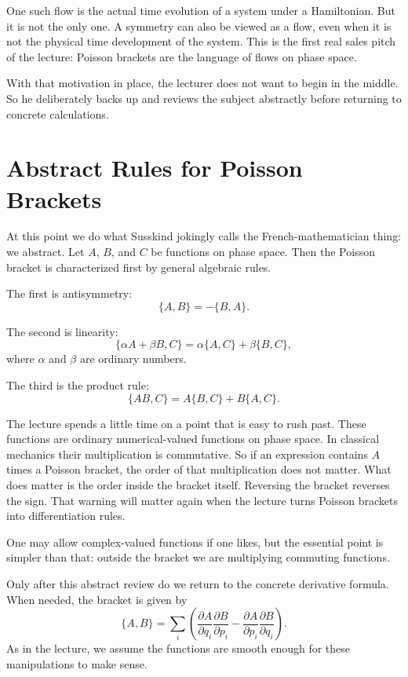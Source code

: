 One such flow is the actual time evolution of a system under a Hamiltonian. But it is not the only one. A symmetry can also be viewed as a flow, even when it is not the physical time development of the system. This is the first real sales pitch of the lecture: Poisson brackets are the language of flows on phase space.

With that motivation in place, the lecturer does not want to begin in the middle. So he deliberately backs up and reviews the subject abstractly before returning to concrete calculations.

\section{Abstract Rules for Poisson Brackets}

At this point we do what Susskind jokingly calls the French-mathematician thing: we abstract. Let \(A\), \(B\), and \(C\) be functions on phase space. Then the Poisson bracket is characterized first by general algebraic rules.

The first is antisymmetry:
\begin{equation}
\{A,B\}=-\{B,A\}.
\end{equation}

The second is linearity:
\begin{equation}
\{\alpha A+\beta B,C\}=\alpha\{A,C\}+\beta\{B,C\},
\end{equation}
where \(\alpha\) and \(\beta\) are ordinary numbers.

The third is the product rule:
\begin{equation}
\{AB,C\}=A\{B,C\}+B\{A,C\}.
\end{equation}

The lecture spends a little time on a point that is easy to rush past. These functions are ordinary numerical-valued functions on phase space. In classical mechanics their multiplication is commutative. So if an expression contains \(A\) times a Poisson bracket, the order of that multiplication does not matter. What does matter is the order inside the bracket itself. Reversing the bracket reverses the sign. That warning will matter again when the lecture turns Poisson brackets into differentiation rules.

One may allow complex-valued functions if one likes, but the essential point is simpler than that: outside the bracket we are multiplying commuting functions.

Only after this abstract review do we return to the concrete derivative formula. When needed, the bracket is given by
\begin{equation}
\{A,B\}=\sum_i\left(
\frac{\partial A}{\partial q_i}\frac{\partial B}{\partial p_i}
-
\frac{\partial A}{\partial p_i}\frac{\partial B}{\partial q_i}
\right).
\end{equation}
As in the lecture, we assume the functions are smooth enough for these manipulations to make sense.

